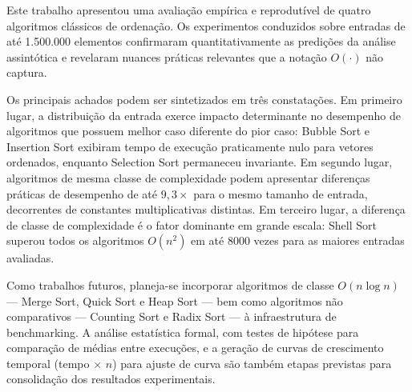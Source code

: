 \documentclass[12pt]{article}
\newcommand{\num}[1]{#1}
\begin{document}
Este trabalho apresentou uma avaliação empírica e reprodutível
de quatro algoritmos clássicos de ordenação. Os experimentos
conduzidos sobre entradas de até 1.500.000 elementos confirmaram
quantitativamente as predições da análise assintótica e
revelaram nuances práticas relevantes que a notação $O(\cdot)$
não captura.

Os principais achados podem ser sintetizados em três constatações.
Em primeiro lugar, a distribuição da entrada exerce impacto
determinante no desempenho de algoritmos que possuem melhor
caso diferente do pior caso: Bubble Sort e Insertion Sort
exibiram tempo de execução praticamente nulo para vetores
ordenados, enquanto Selection Sort permaneceu invariante.
Em segundo lugar, algoritmos de mesma classe de complexidade
podem apresentar diferenças práticas de desempenho de até
$9{,}3\times$ para o mesmo tamanho de entrada, decorrentes
de constantes multiplicativas distintas. Em terceiro lugar,
a diferença de classe de complexidade é o fator dominante
em grande escala: Shell Sort superou todos os algoritmos
$O(n^2)$ em até \num{8000} vezes para as maiores entradas
avaliadas.

Como trabalhos futuros, planeja-se incorporar algoritmos de
classe $O(n \log n)$ — Merge Sort, Quick Sort e Heap Sort —
bem como algoritmos não comparativos — Counting Sort e
Radix Sort — à infraestrutura de benchmarking. A análise
estatística formal, com testes de hipótese para comparação
de médias entre execuções, e a geração de curvas de
crescimento temporal (tempo $\times$ $n$) para ajuste de
curva são também etapas previstas para consolidação dos
resultados experimentais.




%
%
%
%
%
\end{document}
